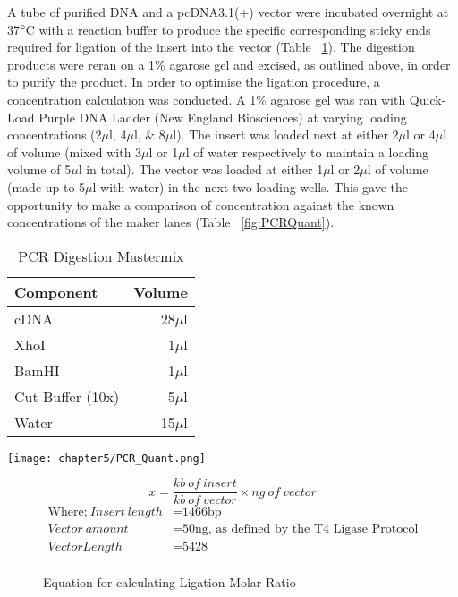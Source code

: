 A tube of purified DNA and a pcDNA3.1(+) vector were incubated overnight at 37$\degree$C with a reaction buffer to produce the specific corresponding sticky ends required for ligation of the insert into the vector (Table ~\ref{tab:PCRDigestion}). The digestion products were reran on a 1\% agarose gel and excised, as outlined above, in order to purify the product. In order to optimise the ligation procedure, a concentration calculation was conducted. A 1\% agarose gel was ran with Quick-Load Purple DNA Ladder (New England Biosciences) at varying loading concentrations (2$\mu$l, 4$\mu$l, \& 8$\mu$l). The insert was loaded next at either 2$\mu$l or 4$\mu$l of volume (mixed with 3$\mu$l or 1$\mu$l of water respectively to maintain a loading volume of 5$\mu$l in total). The vector was loaded at either 1$\mu$l or 2$\mu$l of volume (made up to 5$\mu$l with water) in the next two loading wells. This gave the opportunity to make a comparison of concentration against the known concentrations of the maker lanes (Table ~\ref{fig:PCRQuant}). \\

\begin{table}[!htbp]
\centering
\begin{tabular}{lr}
  
  Component                         & Volume\\
  \hline
  cDNA          & 28$\mu$l \\
  XhoI    & 1$\mu$l \\
  BamHI                              & 1$\mu$l \\
  Cut Buffer (10x)               & 5$\mu$l \\
  Water                          & 15$\mu$l  \\
\end{tabular}
\caption{PCR Digestion Mastermix}
\label{tab:PCRDigestion}
\end{table}

\begin{figure*}[!htbp]
\centering
\texttt{[image: chapter5/PCR\_Quant.png]}
\caption{Semi-quantitative assessment of PCR inserts and vector}
\label{fig:PCRQuant}
\end{figure*}



\begin{figure}
\[ x=\frac{kb\ of\ insert}{kb\ of\ vector}\times ng\ of\ vector\]
\normalsize
\begin{align*}
\text{Where;} ~Insert\ length &= \text{1466bp} \\
Vector\ amount &= \text{50ng, as defined by the T4 Ligase Protocol} \\
Vector Length &= \text{5428} \\
\end{align*}
\caption[Equation for calculating Ligation Molar Ratio]{Equation for calculating Ligation Molar Ratio}
\label{eq:ligationmolar}
\end{figure}

